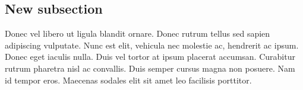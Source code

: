 \subsection{New subsection}

Donec vel libero ut ligula blandit ornare. Donec rutrum tellus sed sapien
adipiscing vulputate. Nunc est elit, vehicula nec molestie ac, hendrerit ac
ipsum. Donec eget iaculis nulla. Duis vel tortor at ipsum placerat
accumsan. Curabitur rutrum pharetra nisl ac convallis. Duis semper cursus magna
non posuere. Nam id tempor eros. Maecenas sodales elit sit amet leo facilisis
porttitor.
